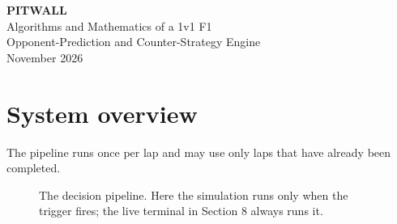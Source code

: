 \documentclass[11pt,a4paper]{article}
\begin{document}
\begin{center}
{\LARGE\bfseries\color{accent} PITWALL}\\[6pt]
{\large Algorithms and Mathematics of a 1v1 F1\\ Opponent-Prediction and Counter-Strategy Engine}\\[6pt]
{\small November 2026}
\end{center}
\vspace{-0.5em}

\begin{abstract}
\noindent PITWALL estimates tyre degradation from public lap times, predicts when an
opponent will pit, and simulates our options to the end of the race to recommend one.
It chains five simple, explainable models rather than one large one. This document
sets out the mathematics of each model, the assumptions behind it, and how the
system was evaluated, including where it falls short. A live terminal runs the same models
during a race and is scored against real results from unseen 2025 and 2026 races. Meta's
Muse Spark then answers an engineer's questions about each call, using only the system's numbers.
It explains the call and cannot change it.
\end{abstract}

\section{System overview}

The pipeline runs once per lap and may use only laps that have already been completed.

\begin{figure}[H]
\centering
{}
\caption{The decision pipeline. Here the simulation runs only when the trigger fires; the live terminal in Section 8 always runs it.}
\end{figure}
\end{document}
